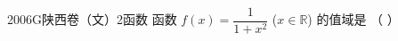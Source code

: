 
\begin{problem}{2006}{G}{陕西卷（文）}{2}{函数}
函数 $ f(x) = \dfrac{1}{1 + x^2} $ ($ x \in \mathbb{R} $) 的值域是 （ ）
\begin{choices}
\choice{{$ (0,1] $}}
\choice{{$ [0,1) $}}
\choice{{$ [0,1] $}}
\end{choices}
\end{problem}

\begin{answer}

\end{answer}

\begin{solutions}

\end{solutions}